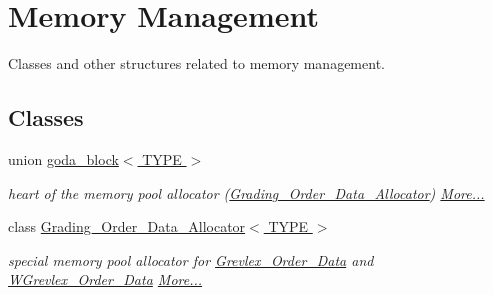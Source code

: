 \hypertarget{group__memorygroup}{}\section{Memory Management}
\label{group__memorygroup}


Classes and other structures related to memory management.  


\subsection*{Classes}
\begin{DoxyCompactItemize}
\item 
union \hyperlink{group__memorygroup_uniongoda__block}{goda\+\_\+block$<$ T\+Y\+P\+E $>$}
\begin{DoxyCompactList}\small\item\em heart of the memory pool allocator (\hyperlink{group__memorygroup_class_grading___order___data___allocator}{Grading\+\_\+\+Order\+\_\+\+Data\+\_\+\+Allocator})  \hyperlink{group__memorygroup_uniongoda__block}{More...}\end{DoxyCompactList}\item 
class \hyperlink{group__memorygroup_class_grading___order___data___allocator}{Grading\+\_\+\+Order\+\_\+\+Data\+\_\+\+Allocator$<$ T\+Y\+P\+E $>$}
\begin{DoxyCompactList}\small\item\em special memory pool allocator for \hyperlink{group__orderinggroup_class_grevlex___order___data}{Grevlex\+\_\+\+Order\+\_\+\+Data} and \hyperlink{group__orderinggroup_class_w_grevlex___order___data}{W\+Grevlex\+\_\+\+Order\+\_\+\+Data}  \hyperlink{group__memorygroup_class_grading___order___data___allocator}{More...}\end{DoxyCompactList}\end{DoxyCompactItemize}
